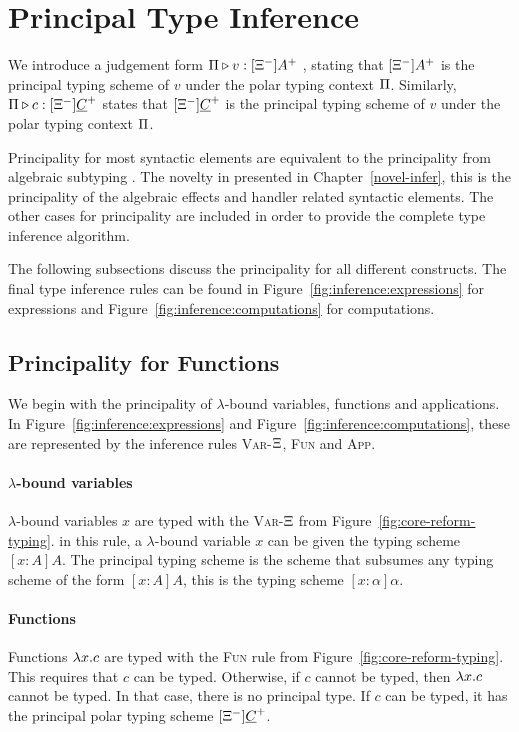 \section{Principal Type Inference}\label{principality}

We introduce a judgement form $\Pi \triangleright v : [\Xi^-]A^+$ , stating that $[\Xi^-]A^+$ is the principal typing scheme of $v$ under the polar typing context $\Pi$. Similarly, $\Pi \triangleright c : [\Xi^-]\underline{C}^+$ states that $[\Xi^-]\underline{C}^+$ is the principal typing scheme of $v$ under the polar typing context $\Pi$.

Principality for most syntactic elements are equivalent to the principality from algebraic subtyping \cite{dolan2017algebraic}. The novelty in presented in Chapter~\ref{novel-infer}, this is the principality of the algebraic effects and handler related syntactic elements. The other cases for principality are included in order to provide the complete type inference algorithm. 

The following subsections discuss the principality for all different constructs. The final type inference rules can be found in Figure~\ref{fig:inference:expressions} for expressions and Figure~\ref{fig:inference:computations} for computations.

\subsection{Principality for Functions}
We begin with the principality of $\lambda$-bound variables, functions and applications. In Figure~\ref{fig:inference:expressions} and Figure~\ref{fig:inference:computations}, these are represented by the inference rules \textsc{Var-$\Xi$}, \textsc{Fun} and \textsc{App}.

\paragraph{$\lambda$-bound variables} $\lambda$-bound variables $x$ are typed with the \textsc{Var-$\Xi$} from Figure~\ref{fig:core-reform-typing}. in this rule, a $\lambda$-bound variable $x$ can be given the typing scheme $[x : A]A$. The principal typing scheme is the scheme that subsumes any typing scheme of the form $[x : A]A$, this is the typing scheme $[x : \alpha]\alpha$.

\paragraph{Functions} Functions $\lambda x .c$ are typed with the \textsc{Fun} rule from Figure~\ref{fig:core-reform-typing}. This requires that $c$ can be typed. Otherwise, if $c$ cannot be typed, then $\lambda x .c$ cannot be typed. In that case, there is no principal type. If $c$ can be typed, it has the principal polar typing scheme $[\Xi^-]\underline{C}^+$.

